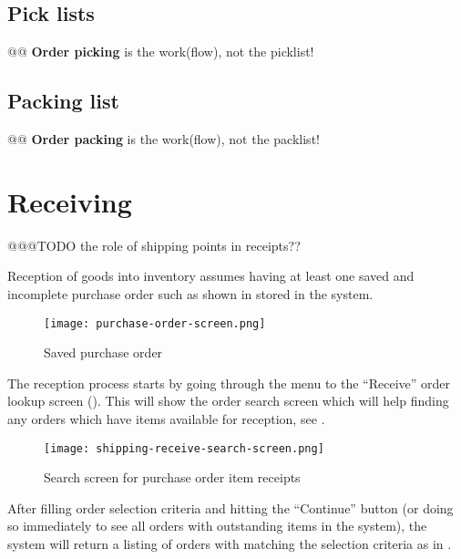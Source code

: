 \subsection{Pick lists}
\label{subsec-business-processes-inventory-shipping-picklist}

@@ \textbf{Order picking} is the work(flow), not the picklist!

\subsection{Packing list}
\label{subsec-business-processes-inventory-shipping-packlist}

@@ \textbf{Order packing} is the work(flow), not the packlist!

\section{Receiving}
\label{sec-business-processes-inventory-receiving}

@@@TODO the role of shipping points in receipts??

Reception of goods into inventory assumes having at least one
saved and incomplete purchase order such as shown in
 stored in the system.

\begin{figure}[h]
\centering
\texttt{[image: purchase-order-screen.png]}
\caption{Saved purchase order}
\label{fig:purchase-order-screen}
\end{figure}

The reception process starts by going through the menu to the
``Receive'' order lookup screen ().
This will show the order search screen which will help finding
any orders which have items available for reception, see .


\begin{figure}[h]
\centering
\texttt{[image: shipping-receive-search-screen.png]}
\caption{Search screen for purchase order item receipts}
\label{fig:shipping-receive-search-screen}
\end{figure}

After filling order selection criteria and hitting the ``Continue'' button (or doing so
immediately to see all orders with outstanding items in the system), the system will return
a listing of orders with matching the selection criteria as in .

